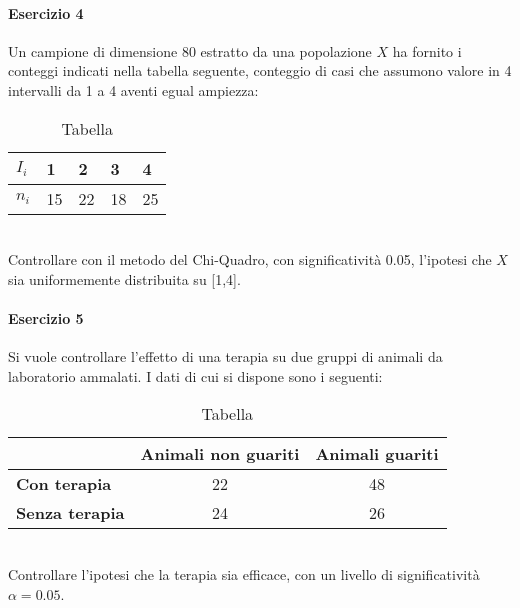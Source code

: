 \documentclass[12pt]{article}
\begin{document}
    \paragraph{Esercizio 4}
    Un campione di dimensione 80 estratto da una popolazione $X$ ha fornito i conteggi indicati nella tabella seguente, conteggio di casi che assumono valore in 4 intervalli da 1 a 4 aventi egual ampiezza:
    \begin{table}[!htb]
        \centering
        \begin{tabular}{|l|l|l|l|l|}
        \hline
        \textbf{$I_i$}                       & 1                       & 2                       & 3                       & 4  \\ \hline
        \multicolumn{1}{|c|}{\textbf{$n_i$}} & \multicolumn{1}{c|}{15} & \multicolumn{1}{c|}{22} & \multicolumn{1}{c|}{18} & 25 \\ \hline
        \end{tabular}
        \caption{Tabella}
        \label{tab:my-table4}
    \end{table}
    \\Controllare con il metodo del Chi-Quadro, con significatività 0.05, l’ipotesi che $X$ sia uniformemente distribuita su [1,4].
    \paragraph{Esercizio 5}
    Si vuole controllare l’effetto di una terapia su due gruppi di animali da laboratorio ammalati. I dati di cui si dispone sono i seguenti:
    \begin{table}[!htb]
        \centering
        \begin{tabular}{l|c|c|}
        \cline{2-3}
                                                     & \multicolumn{1}{l|}{\textbf{Animali non guariti}} & \multicolumn{1}{l|}{\textbf{Animali guariti}} \\ \hline
        \multicolumn{1}{|l|}{\textbf{Con terapia}}   & 22                                                & 48                                            \\ \hline
        \multicolumn{1}{|c|}{\textbf{Senza terapia}} & 24                                                & 26                                            \\ \hline
        \end{tabular}
        \caption{Tabella}
        \label{tab:my-table5}
    \end{table}
    \\Controllare l’ipotesi che la terapia sia efficace, con un livello di significatività $\alpha=0.05$.
\end{document}
